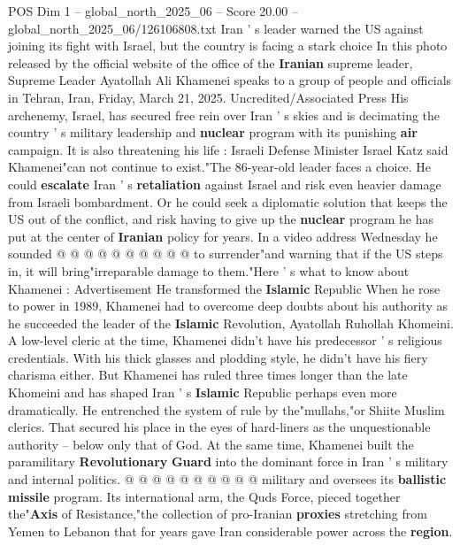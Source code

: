 \begin{textsample}{POS Dim 1 – global\_north\_2025\_06 – Score 20.00 – global\_north\_2025\_06/126106808.txt}  \label{ex:f1_pos_339}
Iran ' s leader warned the US against joining its fight with Israel, but the country is facing a stark choice In this photo released by the official website of the office of the \textbf{Iranian} supreme leader, Supreme Leader Ayatollah Ali Khamenei speaks to a group of people and officials in Tehran, Iran, Friday, March 21, 2025.
Uncredited/Associated Press His archenemy, Israel, has secured free rein over Iran ' s skies and is decimating the country ' s military leadership and \textbf{nuclear} program with its punishing \textbf{air} campaign.
It is also threatening his life : Israeli Defense Minister Israel Katz said Khamenei"can not continue to exist."The 86-year-old leader faces a choice.
He could \textbf{escalate} Iran ' s \textbf{retaliation} against Israel and risk even heavier damage from Israeli bombardment.
Or he could seek a diplomatic solution that keeps the US out of the conflict, and risk having to give up the \textbf{nuclear} program he has put at the center of \textbf{Iranian} policy for years.
In a video address Wednesday he sounded @ @ @ @ @ @ @ @ @ @ to surrender"and warning that if the US steps in, it will bring"irreparable damage to them."Here ' s what to know about Khamenei : Advertisement He transformed the \textbf{Islamic} Republic When he rose to power in 1989, Khamenei had to overcome deep doubts about his authority as he succeeded the leader of the \textbf{Islamic} Revolution, Ayatollah Ruhollah Khomeini.
A low-level cleric at the time, Khamenei didn't have his predecessor ' s religious credentials.
With his thick glasses and plodding style, he didn't have his fiery charisma either.
But Khamenei has ruled three times longer than the late Khomeini and has shaped Iran ' s \textbf{Islamic} Republic perhaps even more dramatically.
He entrenched the system of rule by the"mullahs,"or Shiite Muslim clerics.
That secured his place in the eyes of hard-liners as the unquestionable authority -- below only that of God.
At the same time, Khamenei built the paramilitary \textbf{Revolutionary} \textbf{Guard} into the dominant force in Iran ' s military and internal politics. @ @ @ @ @ @ @ @ @ @ military and oversees its \textbf{ballistic} \textbf{missile} program.
Its international arm, the Quds Force, pieced together the"\textbf{Axis} of Resistance,"the collection of pro-Iranian \textbf{proxies} stretching from Yemen to Lebanon that for years gave Iran considerable power across the \textbf{region}.

\end{textsample}
